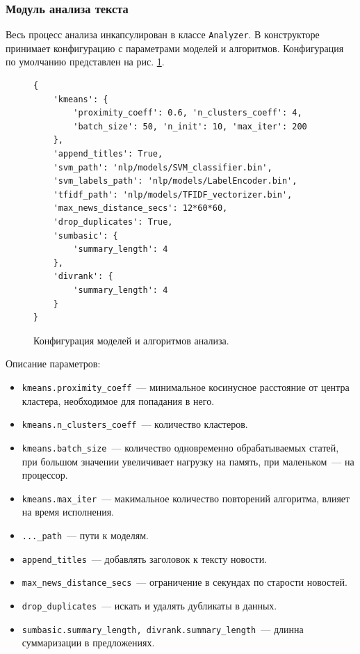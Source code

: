 \documentclass[a4paper, 14pt]{extarticle}
\begin{document}
\subsubsection{Модуль анализа текста}
Весь процесс анализа инкапсулирован в классе \texttt{Analyzer}. В конструкторе принимает конфигурацию с параметрами моделей и алгоритмов. Конфигурация по умолчанию представлен на рис. \ref{config}.

\begin{figure}
	\centering
	\begin{verbatim}
{
    'kmeans': {
        'proximity_coeff': 0.6, 'n_clusters_coeff': 4,
        'batch_size': 50, 'n_init': 10, 'max_iter': 200
    },
    'append_titles': True,
    'svm_path': 'nlp/models/SVM_classifier.bin',
    'svm_labels_path': 'nlp/models/LabelEncoder.bin',
    'tfidf_path': 'nlp/models/TFIDF_vectorizer.bin',
    'max_news_distance_secs': 12*60*60,
    'drop_duplicates': True,
    'sumbasic': {
        'summary_length': 4
    },
    'divrank': {
        'summary_length': 4
    }
}
	\end{verbatim}
	\caption{Конфигурация моделей и алгоритмов анализа.}
	\label{config}
\end{figure}

Описание параметров:

\begin{itemize}
	\item \texttt{kmeans.proximity\_coeff}~--- минимальное косинусное расстояние от центра кластера, необходимое для попадания в него.
	\item \texttt{kmeans.n\_clusters\_coeff}~--- количество кластеров.
	\item \texttt{kmeans.batch\_size}~--- количество одновременно обрабатываемых статей, при большом значении увеличивает нагрузку на память, при маленьком~--- на процессор.
	\item \texttt{kmeans.max\_iter}~--- макимальное количество повторений алгоритма, влияет на время исполнения.
	\item \texttt{...\_path}~--- пути к моделям.
	\item \texttt{append\_titles}~--- добавлять заголовок к тексту новости.
	\item \texttt{max\_news\_distance\_secs}~--- ограничение в секундах по старости новостей.
	\item \texttt{drop\_duplicates}~--- искать и удалять дубликаты в данных.
	\item \texttt{sumbasic.summary\_length, divrank.summary\_length}~--- длинна суммаризации в предложениях. 
\end{itemize}
\end{document}
